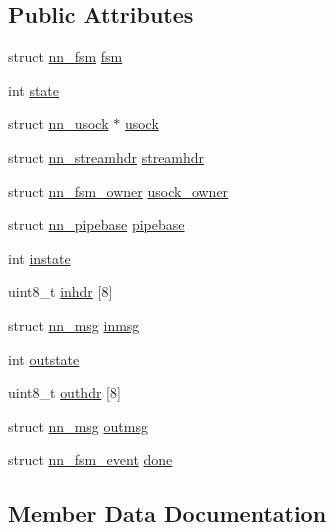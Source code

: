 \subsection*{Public Attributes}
\begin{DoxyCompactItemize}
\item 
struct \hyperlink{structnn__fsm}{nn\+\_\+fsm} \hyperlink{structnn__stcpmux_a13e11d3e9ff4638309d71ed95befdf26}{fsm}
\item 
int \hyperlink{structnn__stcpmux_a7d61af0bb8deb581093f7f038be8d3c1}{state}
\item 
struct \hyperlink{structnn__usock}{nn\+\_\+usock} $\ast$ \hyperlink{structnn__stcpmux_a9d1942933afe0c3ce956c4045286680f}{usock}
\item 
struct \hyperlink{structnn__streamhdr}{nn\+\_\+streamhdr} \hyperlink{structnn__stcpmux_a6e0e4eb9a4390a90c2e681506c97ab26}{streamhdr}
\item 
struct \hyperlink{structnn__fsm__owner}{nn\+\_\+fsm\+\_\+owner} \hyperlink{structnn__stcpmux_a86f66d320ddd64a0706a891eeb4e6be1}{usock\+\_\+owner}
\item 
struct \hyperlink{structnn__pipebase}{nn\+\_\+pipebase} \hyperlink{structnn__stcpmux_a1808787c61208adc62e4031b3686e10c}{pipebase}
\item 
int \hyperlink{structnn__stcpmux_ad8501b9f80ac93856fa96c897bcab634}{instate}
\item 
uint8\+\_\+t \hyperlink{structnn__stcpmux_adf8c5aea3a5ca44c20885ce04ffacf66}{inhdr} \mbox{[}8\mbox{]}
\item 
struct \hyperlink{structnn__msg}{nn\+\_\+msg} \hyperlink{structnn__stcpmux_a98637f2983a1e14916a0c996af8e81ff}{inmsg}
\item 
int \hyperlink{structnn__stcpmux_a8c32969964826f07577f6f2d3f5e4d09}{outstate}
\item 
uint8\+\_\+t \hyperlink{structnn__stcpmux_af2f02c5703dfec8d66124c4990061186}{outhdr} \mbox{[}8\mbox{]}
\item 
struct \hyperlink{structnn__msg}{nn\+\_\+msg} \hyperlink{structnn__stcpmux_abe390b012b46096d47ba8660cee75330}{outmsg}
\item 
struct \hyperlink{structnn__fsm__event}{nn\+\_\+fsm\+\_\+event} \hyperlink{structnn__stcpmux_a94cb62c326bafd2a2ec1b976bade82bf}{done}
\end{DoxyCompactItemize}


\subsection{Member Data Documentation}
